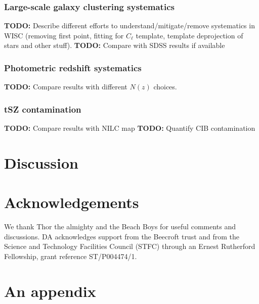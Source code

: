 \documentclass[useAMS,usenatbib]{mn2e}
\newcommand{\TODO}[1]{{\bf TODO:} #1}
\begin{document}
    \subsubsection{Large-scale galaxy clustering systematics}\label{sssec:results.syst.gg}
      \TODO{Describe different efforts to understand/mitigate/remove systematics in WISC (removing first point, fitting for $C_\ell$ template, template deprojection of stars and other stuff).}
      \TODO{Compare with SDSS results if available}
    \subsubsection{Photometric redshift systematics}\label{sssec:results.syst.pz}
      \TODO{Compare results with different $N(z)$ choices.}
    \subsubsection{tSZ contamination}\label{sssec:results.syst.y}
      \TODO{Compare results with NILC map}
      \TODO{Quantify CIB contamination}

\section{Discussion}\label{sec:discussion}
  \lipsum[2]

\section*{Acknowledgements}
  We thank Thor the almighty and the Beach Boys for useful comments and discussions. DA acknowledges support from the Beecroft trust and from the Science and Technology Facilities Council (STFC) through an Ernest Rutherford Fellowship, grant reference ST/P004474/1.
  
\setlength{\bibhang}{2.0em}
\setlength{}


\appendix
\section{An appendix}\label{app:app}
  \lipsum[3]
\end{document}
